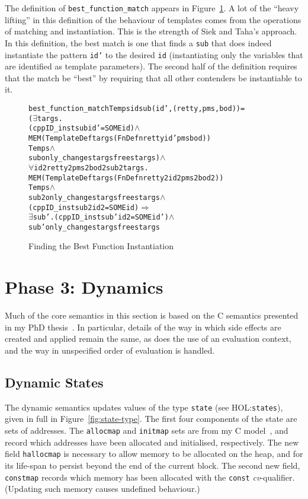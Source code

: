 \documentclass[11pt]{article}
\newcommand{\HOLfile}[1]{HOL:\texttt{#1}}
\begin{document}
The definition of \texttt{best_function_match} appears in
Figure~\ref{fig:best-function-match}.  A lot of the ``heavy lifting''
in this definition of the behaviour of templates comes from the
operations of matching and instantiation.  This is the strength of
Siek and Taha's approach.  In this definition, the best match is one
that finds a \texttt{sub} that does indeed instantiate the pattern
\texttt{id'} to the desired \texttt{id} (instantiating only the
variables that are identified as template parameters).  The second
half of the definition requires that the match be ``best'' by
requiring that all other contenders be instantiable to it.
\begin{figure}[htbp]
\begin{alltt}
   best_function_match Temps id sub (id', (retty,pms,bod)) =
     (\(\exists\)targs.
         (cppID_inst sub id' = SOME id) \(\land\)
         MEM (TemplateDef targs (FnDefn retty id' pms bod))
             Temps \(\land\)
         sub only_changes targsfrees targs) \(\land\)
     \(\forall\)id2 retty2 pms2 bod2 sub2 targs.
         MEM (TemplateDef targs (FnDefn retty2 id2 pms2 bod2))
             Temps \(\land\)
         sub2 only_changes targsfrees targs \(\land\)
         (cppID_inst sub2 id2 = SOME id) \(\Rightarrow\)
         \(\exists\)sub'. (cppID_inst sub' id2 = SOME id') \(\land\)
                sub' only_changes targsfrees targs
\end{alltt}
\caption{Finding the Best Function Instantiation}
\label{fig:best-function-match}
\end{figure}


\section{Phase 3: Dynamics}
\label{sec:phase3}

Much of the core semantics in this section is based on the C semantics
presented in my PhD thesis~\cite{Norrish98}.  In particular, details
of the way in which side effects are created and applied remain the
same, as does the use of an evaluation context, and the way in
unspecified order of evaluation is handled.

\subsection{Dynamic States}
\label{sec:dynamic-states}

The dynamic semantics updates values of the type \texttt{state} (see
\HOLfile{states}), given in full in Figure~\ref{fig:state-type}.  The
first four components of the state are sets of addresses.  The
\texttt{allocmap} and \texttt{initmap} sets are from my C
model~\cite{Norrish98}, and record which addresses have been allocated
and initialised, respectively.  The new field \texttt{hallocmap} is
necessary to allow memory to be allocated on the heap, and for its
life-span to persist beyond the end of the current block.  The second
new field, \texttt{constmap} records which memory has been allocated
with the \texttt{const} \emph{cv}-qualifier.  (Updating such memory
causes undefined behaviour.)
\end{document}
